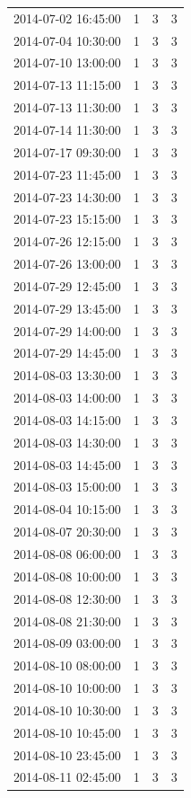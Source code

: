 \begin{tabular}{lrrr}
2014-07-02 16:45:00 & 1 & 3 & 3 \\
2014-07-04 10:30:00 & 1 & 3 & 3 \\
2014-07-10 13:00:00 & 1 & 3 & 3 \\
2014-07-13 11:15:00 & 1 & 3 & 3 \\
2014-07-13 11:30:00 & 1 & 3 & 3 \\
2014-07-14 11:30:00 & 1 & 3 & 3 \\
2014-07-17 09:30:00 & 1 & 3 & 3 \\
2014-07-23 11:45:00 & 1 & 3 & 3 \\
2014-07-23 14:30:00 & 1 & 3 & 3 \\
2014-07-23 15:15:00 & 1 & 3 & 3 \\
2014-07-26 12:15:00 & 1 & 3 & 3 \\
2014-07-26 13:00:00 & 1 & 3 & 3 \\
2014-07-29 12:45:00 & 1 & 3 & 3 \\
2014-07-29 13:45:00 & 1 & 3 & 3 \\
2014-07-29 14:00:00 & 1 & 3 & 3 \\
2014-07-29 14:45:00 & 1 & 3 & 3 \\
2014-08-03 13:30:00 & 1 & 3 & 3 \\
2014-08-03 14:00:00 & 1 & 3 & 3 \\
2014-08-03 14:15:00 & 1 & 3 & 3 \\
2014-08-03 14:30:00 & 1 & 3 & 3 \\
2014-08-03 14:45:00 & 1 & 3 & 3 \\
2014-08-03 15:00:00 & 1 & 3 & 3 \\
2014-08-04 10:15:00 & 1 & 3 & 3 \\
2014-08-07 20:30:00 & 1 & 3 & 3 \\
2014-08-08 06:00:00 & 1 & 3 & 3 \\
2014-08-08 10:00:00 & 1 & 3 & 3 \\
2014-08-08 12:30:00 & 1 & 3 & 3 \\
2014-08-08 21:30:00 & 1 & 3 & 3 \\
2014-08-09 03:00:00 & 1 & 3 & 3 \\
2014-08-10 08:00:00 & 1 & 3 & 3 \\
2014-08-10 10:00:00 & 1 & 3 & 3 \\
2014-08-10 10:30:00 & 1 & 3 & 3 \\
2014-08-10 10:45:00 & 1 & 3 & 3 \\
2014-08-10 23:45:00 & 1 & 3 & 3 \\
2014-08-11 02:45:00 & 1 & 3 & 3 \\

\end{tabular}
